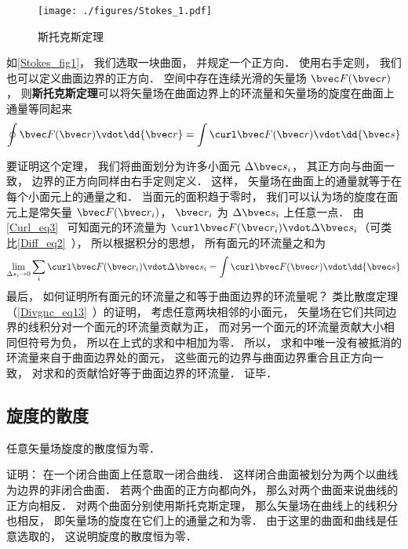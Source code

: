
\begin{issues}
\issueTODO
\end{issues}


\begin{figure}[ht]
\centering
\texttt{[image: ./figures/Stokes\_1.pdf]}
\caption{斯托克斯定理} \label{Stokes_fig1}
\end{figure}

如\autoref{Stokes_fig1}， 我们选取一块曲面， 并规定一个正方向． 使用右手定则， 我们也可以定义曲面边界的正方向． 空间中存在连续光滑的矢量场 $\bvec F(\bvec r)$， 则\textbf{斯托克斯定理}可以将矢量场在曲面边界上的环流量和矢量场的旋度在曲面上通量等同起来
\begin{equation}\label{Stokes_eq1}
\oint \bvec F(\bvec r) \vdot \dd{\bvec r} = \int \curl \bvec F(\bvec r) \vdot \dd{\bvec s}
\end{equation}

要证明这个定理， 我们将曲面划分为许多小面元 $\Delta \bvec s_i$， 其正方向与曲面一致， 边界的正方向同样由右手定则定义． 这样， 矢量场在曲面上的通量就等于在每个小面元上的通量之和． 当面元的面积趋于零时， 我们可以认为场的旋度在面元上是常矢量 $\bvec F(\bvec r_i)$， $\bvec r_i$ 为 $\Delta \bvec s_i$ 上任意一点． 由\autoref{Curl_eq3}~ 可知面元的环流量为 $\curl\bvec F(\bvec r_i) \vdot \Delta \bvec s_i$（可类比\autoref{Diff_eq2}~）， 所以根据积分的思想， 所有面元的环流量之和为
\begin{equation}
\lim_{\Delta s_i \to 0}\sum_i \curl\bvec F(\bvec r_i) \vdot \Delta \bvec s_i = \int \curl\bvec F(\bvec r) \vdot \dd{\bvec s}
\end{equation}
最后， 如何证明所有面元的环流量之和等于曲面边界的环流量呢？ 类比散度定理（\autoref{Divgnc_eq13}~）的证明， 考虑任意两块相邻的小面元， 矢量场在它们共同边界的线积分对一个面元的环流量贡献为正， 而对另一个面元的环流量贡献大小相同但符号为负， 所以在上式的求和中相加为零． 所以， 求和中唯一没有被抵消的环流量来自于曲面边界处的面元， 这些面元的边界与曲面边界重合且正方向一致， 对求和的贡献恰好等于曲面边界的环流量． 证毕．


\subsection{旋度的散度}
\begin{theorem}{}
任意矢量场旋度的散度恒为零．
\end{theorem}
证明： 在一个闭合曲面上任意取一闭合曲线． 这样闭合曲面被划分为两个以曲线为边界的非闭合曲面． 若两个曲面的正方向都向外， 那么对两个曲面来说曲线的正方向相反． 对两个曲面分别使用斯托克斯定理， 那么矢量场在曲线上的线积分也相反， 即矢量场的旋度在它们上的通量之和为零． 由于这里的曲面和曲线是任意选取的， 这说明旋度的散度恒为零．

